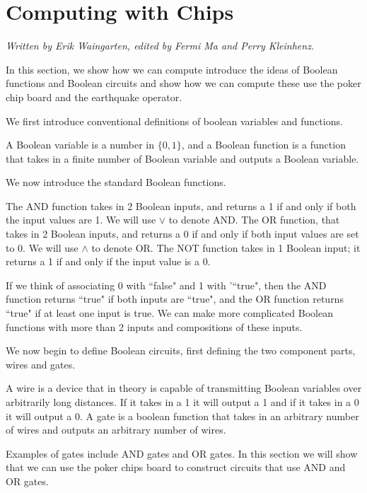 \documentclass[runningheads,a4paper]{llncs}
\begin{document}
\section{Computing with Chips}
\label{Computing with Chips}

\emph{Written by Erik Waingarten, edited by Fermi Ma and Perry Kleinhenz.}

In this section, we show how we can compute introduce the ideas of Boolean functions and Boolean circuits and show how we can compute these use the poker chip board and the earthquake operator.

We first introduce conventional definitions of boolean variables and functions.
\begin{definition} 
A Boolean variable is a number in $\{0,1\}$, and a Boolean function is a function that takes in a finite number of Boolean variable and outputs a Boolean variable.
\end{definition}

We now introduce the standard Boolean functions. 
\begin{definition}
 The AND function takes in 2 Boolean inputs, and returns a 1 if and only if both the input values are 1. We will use $\vee$ to denote AND. The OR function, that takes in 2 Boolean inputs, and returns a 0 if and only if both input values are set to 0. We will use $\wedge$ to denote OR. The NOT function takes in 1 Boolean input; it returns a 1 if and only if the input value is a 0. 
 \end{definition}
 If we think of associating 0 with ``false" and 1 with '``true", then the AND function returns ``true" if both inputs are ``true", and the OR function returns ``true" if at least one input is true. We can make more complicated Boolean functions with more than 2 inputs and compositions of these inputs. 
 
 We now begin to define Boolean circuits, first defining the two component parts, wires and gates.
\begin{definition}
 A wire is a device that in theory is capable of transmitting Boolean variables over arbitrarily long distances. If it takes in a 1 it will output a 1 and if it takes in a 0 it will output a 0. A gate is a boolean function that takes in an arbitrary number of wires and outputs an arbitrary number of wires.
\end{definition}
Examples of gates include AND gates and OR gates. In this section we will show that we can use the poker chips board to construct circuits that use AND and OR gates.
\end{document}
